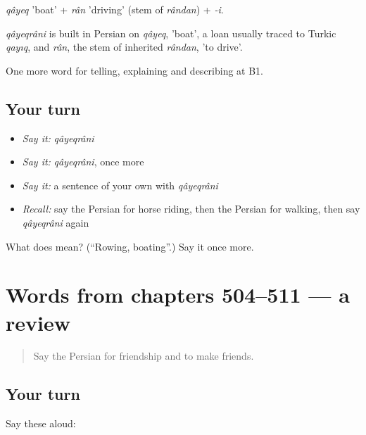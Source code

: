 \emph{qâyeq} 'boat' + \emph{rân} 'driving' (stem of \emph{rândan}) + \emph{-i}.

\begin{cousinweb}
\emph{qâyeqrâni} is built in Persian on \emph{qâyeq}, 'boat', a loan usually traced to Turkic \emph{qayıq}, and \emph{rân}, the stem of inherited \emph{rândan}, 'to drive'.
\end{cousinweb}

\begin{grammarlens}[title={What you've built}]
One more word for telling, explaining and describing at B1.
\end{grammarlens}

\subsection*{Your turn}
\begin{itemize}
\raggedright
  \item \emph{Say it:} \emph{qâyeqrâni}
  \item \emph{Say it:} \emph{qâyeqrâni}, once more
  \item \emph{Say it:} a sentence of your own with \emph{qâyeqrâni}
  \item \emph{Recall:} say the Persian for horse riding, then the Persian for walking, then say \emph{qâyeqrâni} again
\end{itemize}

\begin{tcolorbox}[breakable,colback=teal!4,colframe=teal!35!black,title={Before you move on}]
What does  mean? (\textquotedblleft{}Rowing, boating\textquotedblright{}.) Say it once more.
\end{tcolorbox}
\section[(dialogue)]{Words from chapters 504–511 — a review}

\label{lesson:FA-R511-review-504-511}



\begin{quote}
Say the Persian for friendship and to make friends.
\end{quote}

\subsection*{Your turn}
Say these aloud:

